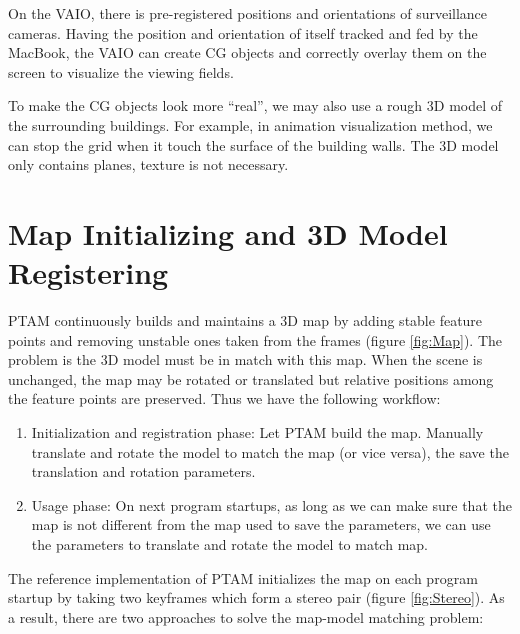 On the VAIO, there is pre-registered positions and orientations of surveillance cameras. Having the position and orientation of itself tracked and fed by the MacBook, the VAIO can create CG objects and correctly overlay them on the screen to visualize the viewing fields.

To make the CG objects look more ``real'', we may also use a rough 3D model of the surrounding buildings. For example, in animation visualization method, we can stop the grid when it touch the surface of the building walls. The 3D model only contains planes, texture is not necessary.


\section{Map Initializing and 3D Model Registering}

PTAM continuously builds and maintains a 3D map by adding stable feature points and removing unstable ones taken from the frames (figure \ref{fig:Map}). The problem is the 3D model must be in match with this map. When the scene is unchanged, the map may be rotated or translated but relative positions among the feature points are preserved. Thus we have the following workflow:

\begin{enumerate}
	\item Initialization and registration phase: Let PTAM build the map. Manually translate and rotate the model to match the map (or vice versa), the save the translation and rotation parameters.
	\item Usage phase: On next program startups, as long as we can make sure that the map is not different from the map used to save the parameters, we can use the parameters to translate and rotate the model to match map.
\end{enumerate}

The reference implementation of PTAM initializes the map on each program startup by taking two keyframes which form a stereo pair (figure \ref{fig:Stereo}). As a result, there are two approaches to solve the map-model matching problem:

